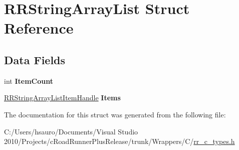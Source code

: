 \hypertarget{struct_r_r_string_array_list}{
\section{\-R\-R\-String\-Array\-List \-Struct \-Reference}
\label{struct_r_r_string_array_list}
}
\subsection*{\-Data \-Fields}
\begin{DoxyCompactItemize}
\item 
\hypertarget{struct_r_r_string_array_list_ab970c710c7f3897df3c63f76dc5a0793}{
int {\bfseries \-Item\-Count}}
\label{struct_r_r_string_array_list_ab970c710c7f3897df3c63f76dc5a0793}

\item 
\hypertarget{struct_r_r_string_array_list_a0ef0ac4d72f04a061dc23decb55cb2ae}{
\hyperlink{struct_r_r_string_array_list_item}{\-R\-R\-String\-Array\-List\-Item\-Handle} {\bfseries \-Items}}
\label{struct_r_r_string_array_list_a0ef0ac4d72f04a061dc23decb55cb2ae}

\end{DoxyCompactItemize}


\-The documentation for this struct was generated from the following file\-:\begin{DoxyCompactItemize}
\item 
\-C\-:/\-Users/hsauro/\-Documents/\-Visual Studio 2010/\-Projects/c\-Road\-Runner\-Plus\-Release/trunk/\-Wrappers/\-C/\hyperlink{rr__c__types_8h}{rr\-\_\-c\-\_\-types.\-h}\end{DoxyCompactItemize}

